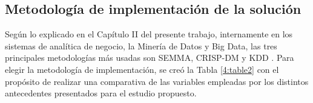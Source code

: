 \subsection{Metodología de implementación de la solución}
 
Según lo explicado en el Capítulo II del presente trabajo, internamente en los sistemas de
analítica de negocio, la Minería de Datos y Big Data, las tres principales metodologías más usadas son
SEMMA, CRISP-DM y KDD \parencite{tec_moine2011metodologiasdm}. Para elegir la
metodología de implementación, se creó la Tabla \ref{4:table2} con el propósito de  realizar una comparativa de las variables empleadas por los distintos antecedentes presentados para el estudio propuesto.
 
\vspace{2ex}
\begingroup
\renewcommand\arraystretch{1.2}
\small
